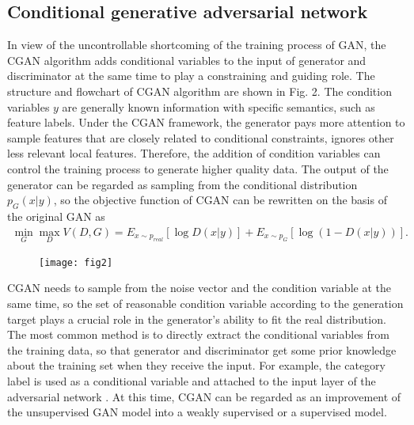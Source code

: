 \documentclass{bmcart}
\begin{document}
\subsection{Conditional generative adversarial network}
In view of the uncontrollable shortcoming of the training process of GAN, the CGAN algorithm adds conditional variables to the input of generator and discriminator at the same time to play a constraining and guiding role. The structure and flowchart of CGAN algorithm are shown in Fig. 2. The condition variables $y$ are generally known information with specific semantics, such as feature labels. Under the CGAN framework, the generator pays more attention to sample features that are closely related to conditional constraints, ignores other less relevant local features. Therefore, the addition of condition variables can control the training process to generate higher quality data. The output of the generator can be regarded as sampling from the conditional distribution ${p_G}\left( {x\left| y \right.} \right)$, so the objective function of CGAN can be rewritten on the basis of the original GAN as
%
\begin{eqnarray}\label{eqexpmuts}
\mathop {\min }\limits_G \mathop {\max }\limits_D V\left( {D,G} \right) = {E_{x \sim {p_{real}}}}\left[ {\log D\left( {x\left| y \right.} \right)} \right] + E{}_{x \sim {p_G}}\left[ {\log \left( {1 - D\left( {x\left| y \right.} \right)} \right)} \right].
\end{eqnarray}
%

  \begin{figure}[h!]
  \texttt{[image: fig2]}
  \caption{}
      \end{figure}

CGAN needs to sample from the noise vector and the condition variable at the same time, so the set of reasonable condition variable according to the generation target plays a crucial role in the generator's ability to fit the real distribution. The most common method is to directly extract the conditional variables from the training data, so that generator and discriminator get some prior knowledge about the training set when they receive the input. For example, the category label is used as a conditional variable and attached to the input layer of the adversarial network \cite{Mirza}. At this time, CGAN can be regarded as an improvement of the unsupervised GAN model into a weakly supervised or a supervised model.
\end{document}
